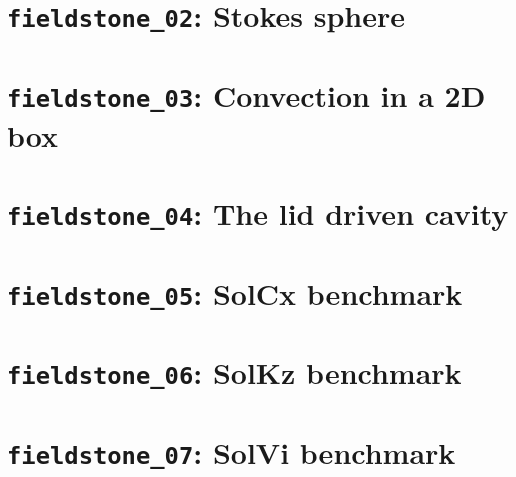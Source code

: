 \documentclass[a4paper]{article}
\begin{document}
\newpage %
\section{{\tt fieldstone\_02}: Stokes sphere \label{f02}} %

\newpage %
\section{{\tt fieldstone\_03}: Convection in a 2D box \label{f03}} %

\newpage %
\section{{\tt fieldstone\_04}: The lid driven cavity \label{f04}} %


\newpage %
\section{{\tt fieldstone\_05}: SolCx benchmark \label{f05}} %

\newpage
\section{{\tt fieldstone\_06}: SolKz benchmark \label{f06}}


\newpage
\section{{\tt fieldstone\_07}: SolVi benchmark \label{f07}}

\end{document}
